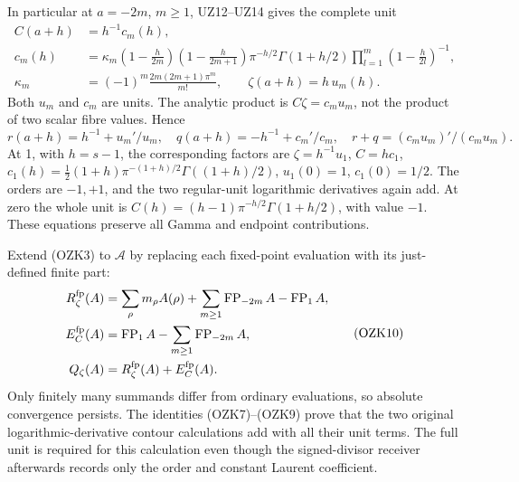 \documentclass[
  10pt,
  a4paper,
]{article}
\begin{document}
In particular at \(a=-2m\), \(m\ge1\), UZ12--UZ14 gives the complete
unit \[
\begin{aligned}
C(a+h)&=h^{-1}c_m(h),\\
c_m(h)&=\kappa_m\left(1-\frac h{2m}\right)
\left(1-\frac h{2m+1}\right)\pi^{-h/2}\Gamma(1+h/2)
\prod_{l=1}^{m}\left(1-\frac h{2l}\right)^{-1},\\
\kappa_m&=(-1)^m\frac{2m(2m+1)\pi^m}{m!},\qquad
\zeta(a+h)=h\,u_m(h).
\end{aligned}\tag{OZK8}
\] Both \(u_m\) and \(c_m\) are units. The analytic product is
\(C\zeta=c_mu_m\), not the product of two scalar fibre values. Hence \[
r(a+h)=h^{-1}+u_m'/u_m,\quad
q(a+h)=-h^{-1}+c_m'/c_m,\quad
r+q=(c_mu_m)'/(c_mu_m).
\tag{OZK9}
\] At 1, with \(h=s-1\), the corresponding factors are
\(\zeta=h^{-1}u_1\), \(C=h c_1\),
\(c_1(h)=\tfrac12(1+h)\pi^{-(1+h)/2}\Gamma((1+h)/2)\), \(u_1(0)=1\),
\(c_1(0)=1/2\). The orders are \(-1,+1\), and the two regular-unit
logarithmic derivatives again add. At zero the whole unit is
\(C(h)=(h-1)\pi^{-h/2}\Gamma(1+h/2)\), with value \(-1\). These
equations preserve all Gamma and endpoint contributions.

Extend (OZK3) to \(\mathscr A\) by replacing each fixed-point evaluation
with its just-defined finite part: \[
\begin{aligned}
R_\zeta^{\rm fp}(A)&=\sum_\rho m_\rho A(\rho)
 +\sum_{m\ge1}\operatorname{FP}_{-2m}A-\operatorname{FP}_1A,\\
E_C^{\rm fp}(A)&=\operatorname{FP}_1A
 -\sum_{m\ge1}\operatorname{FP}_{-2m}A,\\
Q_\zeta(A)&=R_\zeta^{\rm fp}(A)+E_C^{\rm fp}(A).
\end{aligned}\tag{OZK10}
\] Only finitely many summands differ from ordinary evaluations, so
absolute convergence persists. The identities (OZK7)--(OZK9) prove that
the two original logarithmic-derivative contour calculations add with
all their unit terms. The full unit is required for this calculation
even though the signed-divisor receiver afterwards records only the
order and constant Laurent coefficient.
\end{document}
